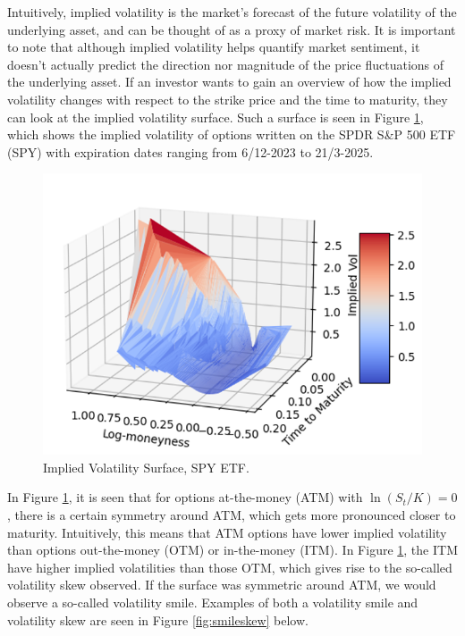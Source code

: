 Intuitively, implied volatility is the market's forecast of the future volatility of the underlying asset, and can be thought of as a proxy of market risk. It is important to note that although implied volatility helps quantify market sentiment, it doesn't actually predict the direction nor magnitude of the price fluctuations of the underlying asset. If an investor wants to gain an overview of how the implied volatility changes with respect to the strike price and the time to maturity, they can look at the implied volatility surface. Such a surface is seen in Figure \ref{fig:impVolsurf}, which shows the implied volatility of options written on the SPDR S\&P 500 ETF (SPY) with expiration dates ranging from 6/12-2023 to 21/3-2025.
\begin{figure}[H]
    \centering
    \includegraphics[scale=0.75]{fig/img/ImpliedVol/vol_surface_lidtflottereigen.PNG}
    \caption{Implied Volatility Surface, SPY ETF.}
    \label{fig:impVolsurf}
\end{figure}
In Figure \ref{fig:impVolsurf}, it is seen that for options at-the-money (ATM) with $\ln(S_{t}/K)=0$, there is a certain symmetry around ATM, which gets more pronounced closer to maturity. Intuitively, this means that ATM options have lower implied volatility than options out-the-money (OTM) or in-the-money (ITM). In Figure \ref{fig:impVolsurf}, the ITM have higher implied volatilities than those OTM, which gives rise to the so-called volatility skew observed. If the surface was symmetric around ATM, we would observe a so-called volatility smile. Examples of both a volatility smile and volatility skew are seen in Figure \ref{fig:smileskew} below.
